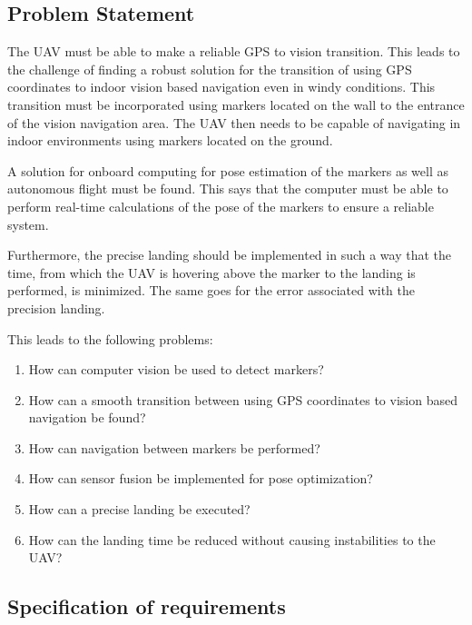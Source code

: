 \documentclass[../Head/report.tex]{subfiles}
\begin{document}
\newpage
\subsection{Problem Statement}
\label{sec:problem_statement}

The UAV must be able to make a reliable GPS to vision transition. This leads to the challenge of finding a robust solution for the transition of using GPS coordinates to indoor vision based navigation even in windy conditions. This transition must be incorporated using markers located on the wall to the entrance of the vision navigation area. The UAV then needs to be capable of navigating in indoor environments using markers located on the ground.    

A solution for onboard computing for pose estimation of the markers as well as autonomous flight must be found. This says that the computer must be able to perform real-time calculations of the pose of the markers to ensure a reliable system. 

Furthermore, the precise landing should be implemented in such a way that the time, from which the UAV is hovering above the marker to the landing is performed, is minimized. The same goes for the error associated with the precision landing.  

This leads to the following problems:

\begin{enumerate}[label=\textbf{P.\arabic*}]
    \item \label{ps:one} How can computer vision be used to detect markers?
    \item \label{ps:two} How can a smooth transition between using GPS coordinates to vision based navigation be found?
    \item \label{ps:three} How can navigation between markers be performed?
    \item \label{ps:four} How can sensor fusion be implemented for pose optimization?
    \item \label{ps:five} How can a precise landing be executed?
    \item \label{ps:six} How can the landing time be reduced without causing instabilities to the UAV?    
\end{enumerate} 

\subsection{Specification of requirements}
\label{sec:specification_of_requirements}
\end{document}
